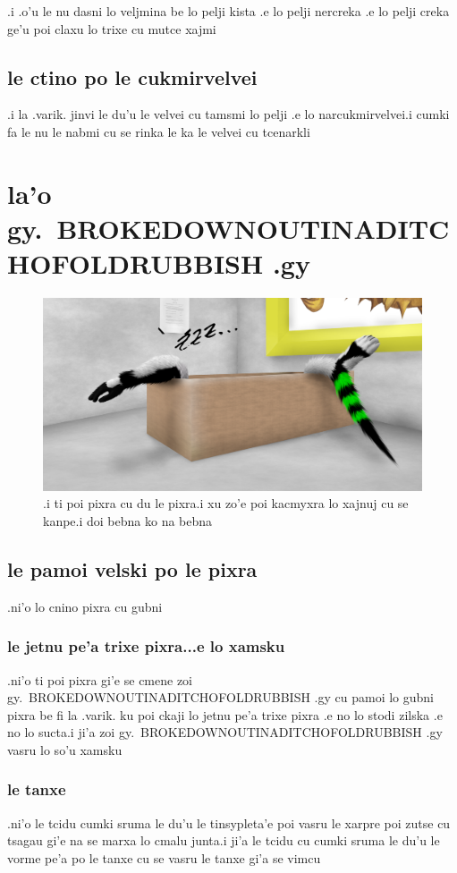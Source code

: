 \documentclass{report}
\begin{document}
.i .o'u le nu dasni lo veljmina be lo pelji kista .e lo pelji nercreka .e lo pelji creka ge'u poi claxu lo trixe cu mutce xajmi

\section{le ctino po le cukmirvelvei}
.i la .varik. jinvi le du'u le velvei cu tamsmi lo pelji .e lo narcukmirvelvei\@  .i cumki fa le nu le nabmi cu se rinka le ka le velvei cu tcenarkli

\chapter{la'o gy.\ BROKEDOWNOUTINADITCHOFOLDRUBBISH .gy}
\begin{figure}[ht]
	\centering
	\includegraphics[width=\textwidth]{brokedownoutinaditchofoldrubbish/brokedownoutinaditchofoldrubbish.png}
	\caption[center]{.i ti poi pixra cu du le pixra\@  .i xu zo'e poi kacmyxra lo xajnuj cu se kanpe\@  .i doi bebna ko na bebna}
\end{figure}
\section{le pamoi velski po le pixra}
.ni'o lo cnino pixra cu gubni

\subsection{le jetnu pe'a trixe pixra...e lo xamsku}
.ni'o ti poi pixra gi'e se cmene zoi gy.\ BROKEDOWNOUTINADITCHOFOLDRUBBISH .gy cu pamoi lo gubni pixra be fi la .varik. ku poi ckaji lo jetnu pe'a trixe pixra .e no lo stodi zilska .e no lo sucta\@  .i ji'a zoi gy.\ BROKEDOWNOUTINADITCHOFOLDRUBBISH .gy vasru lo so'u xamsku

\subsection{le tanxe}
.ni'o le tcidu cumki sruma le du'u le tinsypleta'e poi vasru le xarpre poi zutse cu tsagau gi'e na se marxa lo cmalu junta\@  .i ji'a le tcidu cu cumki sruma le du'u le vorme pe'a po le tanxe cu se vasru le tanxe gi'a se vimcu
\end{document}
